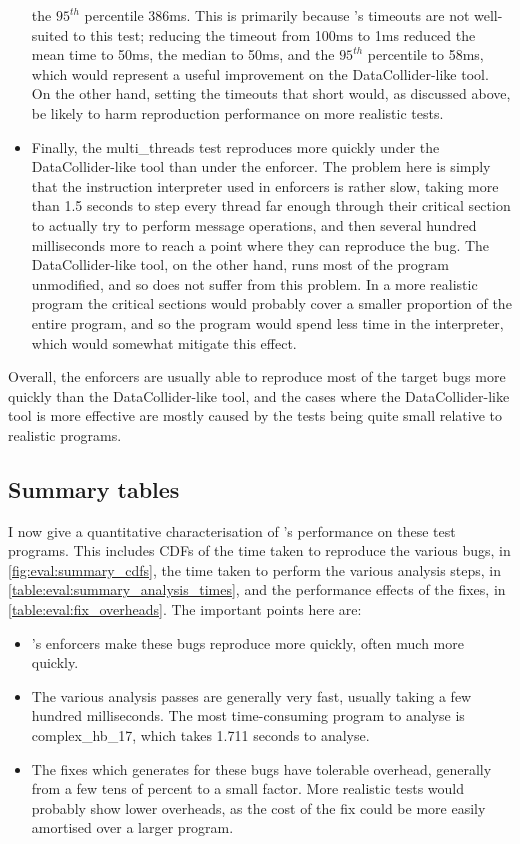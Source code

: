 \begin{itemize}
  the $95^{th}$ percentile 386ms.  This is primarily because
  {\technique}'s timeouts are not well-suited to this test; reducing
  the timeout from 100ms to 1ms reduced the mean time to 50ms, the
  median to 50ms, and the $95^{th}$ percentile to 58ms, which would
  represent a useful improvement on the DataCollider-like tool.  On
  the other hand, setting the timeouts that short would, as discussed
  above, be likely to harm reproduction performance on more realistic
  tests.
\item Finally, the multi\_threads test reproduces more quickly under
  the DataCollider-like tool than under the {\technique} enforcer.
  The problem here is simply that the instruction interpreter used in
  {\technique} enforcers is rather slow, taking more than 1.5 seconds
  to step every thread far enough through their critical section to
  actually try to perform message operations, and then several hundred
  milliseconds more to reach a point where they can reproduce the bug.
  The DataCollider-like tool, on the other hand, runs most of the
  program unmodified, and so does not suffer from this problem.  In a
  more realistic program the critical sections would probably cover a
  smaller proportion of the entire program, and so the program would
  spend less time in the interpreter, which would somewhat mitigate
  this effect.
\end{itemize}

Overall, the {\technique} enforcers are usually able to reproduce most
of the target bugs more quickly than the DataCollider-like tool, and
the cases where the DataCollider-like tool is more effective are
mostly caused by the tests being quite small relative to realistic
programs.

\subsection{Summary tables}

I now give a quantitative characterisation of {\technique}'s
performance on these test programs.  This includes CDFs of the time
taken to reproduce the various bugs, in
\autoref{fig:eval:summary_cdfs}, the time taken to perform the various
analysis steps, in \autoref{table:eval:summary_analysis_times}, and
the performance effects of the fixes, in
\autoref{table:eval:fix_overheads}.  The important points here are:

\begin{itemize}
\item {\Technique}'s enforcers make these bugs reproduce more quickly,
  often much more quickly.
\item The various analysis passes are generally very fast, usually
  taking a few hundred milliseconds.  The most time-consuming program
  to analyse is complex\_hb\_17, which takes 1.711 seconds to analyse.
\item The fixes which {\technique} generates for these bugs have
  tolerable overhead, generally from a few tens of percent to a small
  factor.  More realistic tests would probably show lower overheads,
  as the cost of the fix could be more easily amortised over a larger
  program.
\end{itemize}

